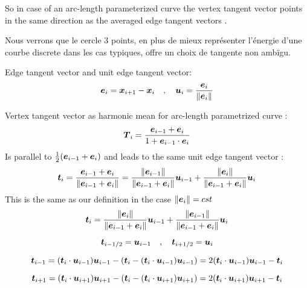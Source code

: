 So in case of an arc-length parameterized curve the vertex tangent vector points in the same direction as the averaged edge tangent vectors \cite[p. 12]{Hoffmann2008}.

Nous verrons que le cercle 3 points, en plus de mieux représenter l'énergie d'une courbe discrete dans les cas typiques, offre un choix de tangente non ambïgu.

Edge tangent vector and unit edge tangent vector:
\begin{equation}
	\boldsymbol{e}_{i} = \boldsymbol{x}_{i+1} - \boldsymbol{x}_{i}
	\quad , \quad
	\boldsymbol{u}_{i} = \frac{\boldsymbol{e}_{i}}{\lVert\boldsymbol{e}_{i}\rVert}
\end{equation}

Vertex tangent vector as harmonic mean for arc-length parametrized curve \cite[p.12]{Hoffmann2008} :
\begin{equation}
	\boldsymbol{T}_{i} = \frac{\boldsymbol{e}_{i-1} + \boldsymbol{e}_{i}}{1 + \boldsymbol{e}_{i-1} \cdot \boldsymbol{e}_{i}}	
\end{equation}
Is parallel to $\frac{1}{2} (\boldsymbol{e}_{i-1} + \boldsymbol{e}_{i})$ and leads to the same unit edge tangent vector : 
\begin{equation}
	\boldsymbol{t}_{i} = \frac{\boldsymbol{e}_{i-1} + \boldsymbol{e}_{i}}{\lVert\boldsymbol{e}_{i-1} + \boldsymbol{e}_{i}\rVert}
			= \frac{\lVert\boldsymbol{e}_{i-1}\rVert}{\lVert\boldsymbol{e}_{i-1} + \boldsymbol{e}_{i}\rVert} \boldsymbol{u}_{i-1}
			+  \frac{\lVert\boldsymbol{e}_{i}\rVert}{\lVert\boldsymbol{e}_{i-1} + \boldsymbol{e}_{i}\rVert} \boldsymbol{u}_{i}
\end{equation}
This is the same as our definition in the case $\lVert\boldsymbol{e}_i\rVert=cst$
\begin{equation}
	\boldsymbol{t}_{i} =  	\frac{\lVert\boldsymbol{e}_{i}\rVert}{\lVert\boldsymbol{e}_{i-1} + \boldsymbol{e}_{i}\rVert} \boldsymbol{u}_{i-1}
			+ 	\frac{\lVert\boldsymbol{e}_{i-1}\rVert}{\lVert\boldsymbol{e}_{i-1} + \boldsymbol{e}_{i}\rVert} \boldsymbol{u}_{i}
\end{equation}

\begin{equation}
	\boldsymbol{t}_{i-1/2} = \boldsymbol{u}_{i-1}
	\quad , \quad
	\boldsymbol{t}_{i+1/2} = \boldsymbol{u}_{i}
\end{equation}

\begin{equation}
	\boldsymbol{t}_{i-1} =  	(\boldsymbol{t}_{i} \cdot \boldsymbol{u}_{i-1}) \boldsymbol{u}_{i-1}
			    - 	(\boldsymbol{t}_{i} - (\boldsymbol{t}_{i} \cdot \boldsymbol{u}_{i-1}) \boldsymbol{u}_{i-1})
			    = 2 (\boldsymbol{t}_{i} \cdot \boldsymbol{u}_{i-1}) \boldsymbol{u}_{i-1} - \boldsymbol{t}_{i}
\end{equation}

\begin{equation}
	\boldsymbol{t}_{i+1} =  (\boldsymbol{t}_{i} \cdot \boldsymbol{u}_{i+1}) \boldsymbol{u}_{i+1}
			    - 	(\boldsymbol{t}_{i} - (\boldsymbol{t}_{i} \cdot \boldsymbol{u}_{i+1}) \boldsymbol{u}_{i+1})
			    = 2 (\boldsymbol{t}_{i} \cdot \boldsymbol{u}_{i+1}) \boldsymbol{u}_{i+1} - \boldsymbol{t}_{i}
\end{equation}

